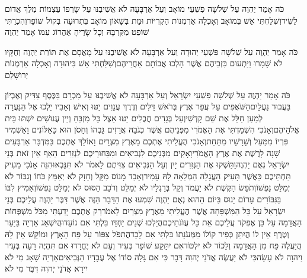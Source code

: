 \documentclass[../main/main.tex]{subfiles}
\begin{document}
\begin{multicols}{\ncols}
כֹּה אָמַר יַהְוֶה עַל שְׁלֹשָׁה פִּשְׁעֵי מוֹאָב וְעַל אַרְבָּעָה לֹא אֲשִׁיבֶנּוּ עַל שָׂרְפוֹ עַצְמוֹת מֶלֶךְ אֱדוֹם לַשִּׂיד\PreVerseSpace{}וְשִׁלַּחְתִּי אֵשׁ בְּמוֹאָב וְאָכְלָה אַרְמְנוֹת הַקְּרִיּוֹת וּמֵת בְּשָׁאוֹן מוֹאָב בִּתְרוּעָה בְּקוֹל שׁוֹפָר\PreVerseSpace{}וְהִכְרַתִּי שׁוֹפֵט מִקִּרְבָּהּ וְכָל שָׂרֶיהָ אֶהֱרוֹג עִמּוֹ אָמַר יַהְוֶה\OpenSection{}\par
{}כֹּה אָמַר יַהְוֶה עַל שְׁלֹשָׁה פִּשְׁעֵי יְהוּדָה וְעַל אַרְבָּעָה לֹא אֲשִׁיבֶנּוּ עַל מָאֳסָם אֶת תּוֹרַת יַהְוֶה וְחֻקָּיו לֹא שָׁמָרוּ וַיַּתְעוּם כִּזְבֵיהֶם אֲשֶׁר הָלְכוּ אֲבוֹתָם אַחֲרֵיהֶם\PreVerseSpace{}וְשִׁלַּחְתִּי אֵשׁ בִּיהוּדָה וְאָכְלָה אַרְמְנוֹת יְרוּשָׁלֵם\OpenSection{}\par
{}כֹּה אָמַר יַהְוֶה עַל שְׁלֹשָׁה פִּשְׁעֵי יִשְׂרָאֵל וְעַל אַרְבָּעָה לֹא אֲשִׁיבֶנּוּ עַל מִכְרָם בַּכֶּסֶף צַדִּיק וְאֶבְיוֹן בַּעֲבוּר נַעֲלָיִם\PreVerseSpace{}הַשֹּׁאֲפִים עַל עֲפַר אֶרֶץ בְּרֹאשׁ דַּלִּים וְדֶרֶךְ עֲנָוִים יַטּוּ וְאִישׁ וְאָבִיו יֵלְכוּ אֶל הַנַּעֲרָה לְמַעַן חַלֵּל אֶת שֵׁם קָדְשִׁי\PreVerseSpace{}וְעַל בְּגָדִים חֲבֻלִים יַטּוּ אֵצֶל כָּל מִזְבֵּחַ וְיֵין עֲנוּשִׁים יִשְׁתּוּ בֵּית אֱלֹהֵיהֶם\PreVerseSpace{}וְאָנֹכִי הִשְׁמַדְתִּי אֶת הָאֱמֹרִי מִפְּנֵיהֶם אֲשֶׁר כְּגֹבַהּ אֲרָזִים גָּבְהוֹ וְחָסֹן הוּא כָּאַלּוֹנִים וָאַשְׁמִיד פִּרְיוֹ מִמַּעַל וְשָׁרָשָׁיו מִתָּחַת\PreVerseSpace{}וְאָנֹכִי הֶעֱלֵיתִי אֶתְכֶם מֵאֶרֶץ מִצְרָיִם וָאוֹלֵךְ אֶתְכֶם בַּמִּדְבָּר אַרְבָּעִים שָׁנָה לָרֶשֶׁת אֶת אֶרֶץ הָאֱמֹרִי\PreVerseSpace{}וָאָקִים מִבְּנֵיכֶם לִנְבִיאִים וּמִבַּחוּרֵיכֶם לִנְזִרִים הַאַף אֵין זֹאת בְּנֵי יִשְׂרָאֵל נְאֻם יַהְוֶה\PreVerseSpace{}וַתַּשְׁקוּ אֶת הַנְּזִרִים יָיִן וְעַל הַנְּבִיאִים צִוִּיתֶם לֵאמֹר לֹא תִּנָּבְאוּ\PreVerseSpace{}הִנֵּה אָנֹכִי מֵעִיק תַּחְתֵּיכֶם כַּאֲשֶׁר תָּעִיק הָעֲגָלָה הַמְלֵאָה לָהּ עָמִיר\PreVerseSpace{}וְאָבַד מָנוֹס מִקָּל וְחָזָק לֹא יְאַמֵּץ כֹּחוֹ וְגִבּוֹר לֹא יְמַלֵּט נַפְשׁוֹ\PreVerseSpace{}וְתֹפֵשׂ הַקֶּשֶׁת לֹא יַעֲמֹד וְקַל בְּרַגְלָיו לֹא יְמַלֵּט וְרֹכֵב הַסּוּס לֹא יְמַלֵּט נַפְשׁוֹ\PreVerseSpace{}וְאַמִּיץ לִבּוֹ בַּגִּבּוֹרִים עָרוֹם יָנוּס בַּיּוֹם הַהוּא נְאֻם יַהְוֶה \ClosedSection{}שִׁמְעוּ אֶת הַדָּבָר הַזֶּה אֲשֶׁר דִּבֶּר יַהְוֶה עֲלֵיכֶם בְּנֵי יִשְׂרָאֵל עַל כָּל הַמִּשְׁפָּחָה אֲשֶׁר הֶעֱלֵיתִי מֵאֶרֶץ מִצְרַיִם לֵאמֹר\PreVerseSpace{}רַק אֶתְכֶם יָדַעְתִּי מִכֹּל מִשְׁפְּחוֹת הָאֲדָמָה עַל כֵּן אֶפְקֹד עֲלֵיכֶם אֵת כָּל עֲוֺנֹתֵיכֶם\PreVerseSpace{}הֲיֵלְכוּ שְׁנַיִם יַחְדָּו בִּלְתִּי אִם נוֹעָדוּ\PreVerseSpace{}הֲיִשְׁאַג אַרְיֵה בַּיַּעַר וְטֶרֶף אֵין לוֹ הֲיִתֵּן כְּפִיר קוֹלוֹ מִמְּעֹנָתוֹ בִּלְתִּי אִם לָכָד\PreVerseSpace{}הֲתִפֹּל צִפּוֹר עַל פַּח הָאָרֶץ וּמוֹקֵשׁ אֵין לָהּ הֲיַעֲלֶה פַּח מִן הָאֲדָמָה וְלָכוֹד לֹא יִלְכּוֹד\PreVerseSpace{}אִם יִתָּקַע שׁוֹפָר בְּעִיר וְעָם לֹא יֶחֱרָדוּ אִם תִּהְיֶה רָעָה בְּעִיר וַיהוָה לֹא עָשָׂה\PreVerseSpace{}כִּי לֹא יַעֲשֶׂה אֲדֹנַי יְהוִה דָּבָר כִּי אִם גָּלָה סוֹדוֹ אֶל עֲבָדָיו הַנְּבִיאִים\PreVerseSpace{}אַרְיֵה שָׁאָג מִי לֹא יִירָא אֲדֹנַי יְהוִה דִּבֶּר מִי לֹא 
\end{multicols}
\end{document}
